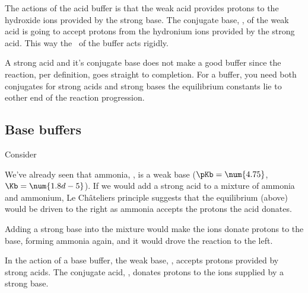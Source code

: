 \documentclass[../mit-general-chemistry.tex]{subfiles}
\begin{document}
The actions of the acid buffer is that the weak acid provides protons
to the hydroxide ions provided by the strong base. The conjugate base,
, of the weak acid is going to accept protons from the
hydronium ions provided by the strong acid. This way the \pH\ of the
buffer acts rigidly.

A strong acid and it's conjugate base does not make a good buffer
since the reaction, per definition, goes straight to completion. For a
buffer, you need both conjugates for strong acids and strong bases the
equilibrium constants lie to eother end of the reaction progression.





\subsection{Base buffers}


Consider 

We've already seen that ammonia, , is a weak base ($\pKb =
\num{4.75}$, $\Kb = \num{1.8d-5}$). If we would add a strong acid to a
mixture of ammonia and ammonium, Le Châteliers principle suggests that
the equilibrium (above) would be driven to the right as ammonia
accepts the protons the acid donates.

Adding a strong base into the mixture would make the  ions
donate protons to the base, forming ammonia again, and it would drove
the reaction to the left.

In the action of a base buffer, the weak base, , accepts protons
provided by strong acids. The conjugate acid, , donates
protons to the  ions supplied by a strong base.
\end{document}

